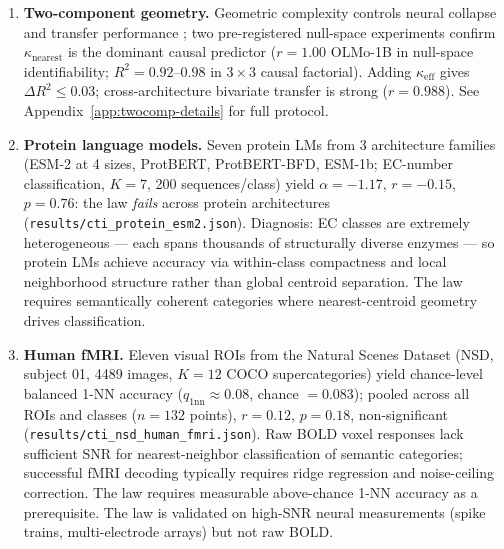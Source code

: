 \documentclass{article}
\begin{document}
\begin{enumerate}
\item \textbf{Two-component geometry.} Geometric complexity controls neural collapse and transfer performance \citep{munn2024}; two pre-registered null-space experiments confirm $\kappa_{\mathrm{nearest}}$ is the dominant causal predictor ($r=1.00$ OLMo-1B in null-space identifiability; $R^2=0.92$--$0.98$ in $3\times3$ causal factorial). Adding $\kappa_{\mathrm{eff}}$ gives $\Delta R^2\leq0.03$; cross-architecture bivariate transfer is strong ($r=0.988$). See Appendix~\ref{app:twocomp-details} for full protocol.
\item \textbf{Protein language models.} Seven protein LMs from 3 architecture families (ESM-2 at 4 sizes, ProtBERT, ProtBERT-BFD, ESM-1b; EC-number classification, $K=7$, 200 sequences/class) yield $\alpha=-1.17$, $r=-0.15$, $p=0.76$: the law \emph{fails} across protein architectures (\texttt{results/cti\_protein\_esm2.json}). Diagnosis: EC classes are extremely heterogeneous --- each spans thousands of structurally diverse enzymes --- so protein LMs achieve accuracy via within-class compactness and local neighborhood structure rather than global centroid separation. The law requires semantically coherent categories where nearest-centroid geometry drives classification.
\item \textbf{Human fMRI.} Eleven visual ROIs from the Natural Scenes Dataset (NSD, subject 01, 4489 images, $K=12$ COCO supercategories) yield chance-level balanced 1-NN accuracy ($q_\mathrm{1nn}\approx0.08$, chance $=0.083$); pooled across all ROIs and classes ($n=132$ points), $r=0.12$, $p=0.18$, non-significant (\texttt{results/cti\_nsd\_human\_fmri.json}). Raw BOLD voxel responses lack sufficient SNR for nearest-neighbor classification of semantic categories; successful fMRI decoding typically requires ridge regression and noise-ceiling correction. The law requires measurable above-chance 1-NN accuracy as a prerequisite. The law is validated on high-SNR neural measurements (spike trains, multi-electrode arrays) but not raw BOLD.
\end{enumerate}
\end{document}
